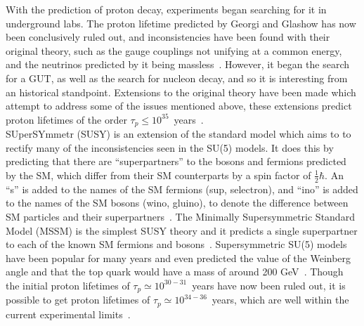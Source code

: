 With the prediction of proton decay, experiments began searching for it in underground labs. The proton lifetime predicted by Georgi and Glashow has now been conclusively ruled out, and inconsistencies have been found with their original theory, such as the gauge couplings not unifying at a common energy, and the neutrinos predicted by it being massless~\citep{Senjanovic:2009kr}. However, it began the search for a GUT, as well as the search for nucleon decay, and so it is interesting from an historical standpoint. Extensions to the original theory have been made which attempt to address some of the issues mentioned above, these extensions predict proton lifetimes of the order $\tau_{p} \leq 10^{35}$~years~\citep{Foot1989, Dorsner:2005fq}. \\

SUperSYmmetr (SUSY) is an extension of the standard model which aims to to rectify many of the inconsistencies seen in the SU(5) models. It does this by predicting that there are ``superpartners'' to the bosons and fermions predicted by the SM, which differ from their SM counterparts by a spin factor of $\frac{1}{2}\hbar$. An ``s'' is added to the names of the SM fermions (sup, selectron), and ``ino'' is added to the names of the SM bosons (wino, gluino), to denote the difference between SM particles and their superpartners~\citep{Martin:1997ns}. The Minimally Supersymmetric Standard Model (MSSM) is the simplest SUSY theory and it predicts a single superpartner to each of the known SM fermions and bosons~\citep{Castano:1993ri}. Supersymmetric SU(5) models have been popular for many years and even predicted the value of the Weinberg angle and that the top quark would have a mass of around 200 GeV~\citep{Senjanovic:2009kr}. Though the initial proton lifetimes of $\tau_{p} \simeq 10^{30-31}$~years have now been ruled out, it is possible to get proton lifetimes of $\tau_{p} \simeq 10^{34-36}$~years, which are well within the current experimental limits~\citep{Gomez:1999kv}. \\


